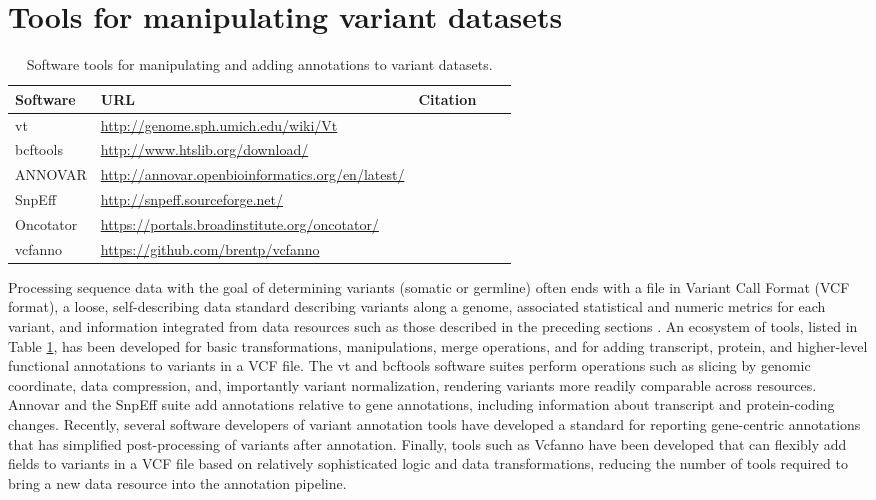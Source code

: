 \documentclass{article}
\begin{document}
\section{Tools for manipulating variant datasets}

 
\begin{table}[p]
\centering
\begin{tabularx}{\textwidth}{p{3cm}XXp{1.5cm}p{1.5cm}}
  \hline
  Software & URL & Citation \\
  \hline
  vt & \url{http://genome.sph.umich.edu/wiki/Vt} & \cite{Tan2015-dv} \\
  bcftools & \url{http://www.htslib.org/download/} & \cite{Li2009-du} \\
  ANNOVAR & \url{http://annovar.openbioinformatics.org/en/latest/} & \cite{Wang2010-bt} \\
  SnpEff & \url{http://snpeff.sourceforge.net/} & \cite{Cingolani2012-pt} \\
  Oncotator & \url{https://portals.broadinstitute.org/oncotator/} &
  \cite{Ramos2015-vn} \\
  vcfanno & \url{https://github.com/brentp/vcfanno} &
  \cite{Pedersen2016-pu} \\
  \hline
\end{tabularx}
\caption{Software tools for manipulating and adding annotations to variant datasets. }
\label{table:4}
\end{table}
  


Processing sequence data with the goal of determining variants
(somatic or germline) often ends with a file in Variant Call Format
(VCF format), a loose, self-describing data standard describing
variants along a genome, associated statistical and numeric metrics
for each variant, and information integrated from data resources such
as those described in the preceding sections \cite{Danecek2011-du}. An
ecosystem of tools, listed in Table \ref{table:4}, has been developed for basic
transformations, manipulations, merge operations, and for adding
transcript, protein, and higher-level functional annotations to
variants in a VCF file. The vt and bcftools software suites perform
operations such as slicing by genomic coordinate, data compression,
and, importantly variant normalization, rendering variants more
readily comparable across resources. Annovar
\cite{Yang2015-bg,Wang2010-bt} and the SnpEff suite
\cite{Cingolani2012-pt} add annotations relative to gene annotations,
including information about transcript and protein-coding
changes. Recently, several software developers of variant annotation
tools have developed a standard for reporting gene-centric annotations
that has simplified post-processing of variants after
annotation. Finally, tools such as Vcfanno \cite{Pedersen2016-pu} have
been developed that can flexibly add fields to variants in a VCF file
based on relatively sophisticated logic and data transformations,
reducing the number of tools required to bring a new data resource
into the annotation pipeline.
\end{document}
